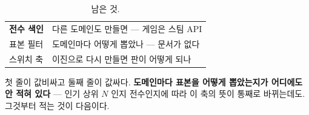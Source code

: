 \documentclass[10pt]{article}
\begin{document}
\begin{table}[t]
\centering\tsize
\caption{남은 것.}
\begin{tabular}{ll}
\toprule
\textbf{전수 색인} & 다른 도메인도 만들면 --- 게임은 스팀 API \\
표본 필터 & 도메인마다 어떻게 뽑았나 --- 문서가 없다 \\
스위치 축 & 이진으로 다시 만들면 판이 어떻게 되나 \\
\bottomrule
\end{tabular}
\end{table}

첫 줄이 값비싸고 둘째 줄이 값싸다. \textbf{도메인마다 표본을 어떻게
뽑았는지가 어디에도 안 적혀 있다} --- 인기 상위 $N$ 인지 전수인지에 따라
이 축의 뜻이 통째로 바뀌는데도. 그것부터 적는 것이 다음이다.
\end{document}
